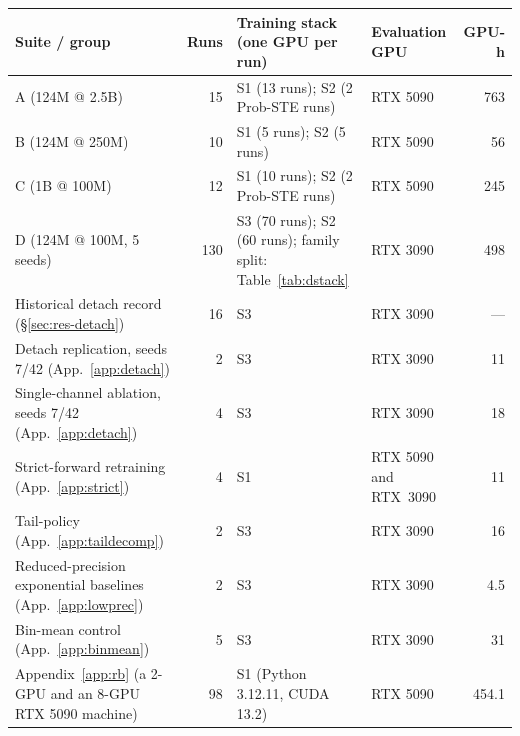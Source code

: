 \begin{tabular}{>{\raggedright\arraybackslash}p{5.2cm}rp{5.0cm}>{\raggedright\arraybackslash}p{2.4cm}r}
\toprule
Suite / group & Runs & Training stack (one GPU per run) & Evaluation GPU & GPU-h \\
\midrule
A (124M @ 2.5B) & 15 & S1 (13 runs); S2 (2 Prob-STE runs) & RTX 5090 & 763 \\
B (124M @ 250M) & 10 & S1 (5 runs); S2 (5 runs) & RTX 5090 & 56 \\
C (1B @ 100M) & 12 & S1 (10 runs); S2 (2 Prob-STE runs) & RTX 5090 & 245 \\
D (124M @ 100M, 5 seeds) & 130 & S3 (70 runs); S2 (60 runs); family split: Table~\ref{tab:dstack} & RTX 3090 & 498 \\
\midrule Historical detach record (\S\ref{sec:res-detach}) & 16 & S3 & RTX 3090 & --- \\
Detach replication, seeds 7/42 (App.~\ref{app:detach}) & 2 & S3 & RTX 3090 & 11 \\
Single-channel ablation, seeds 7/42 (App.~\ref{app:detach}) & 4 & S3 & RTX 3090 & 18 \\
Strict-forward retraining (App.~\ref{app:strict}) & 4 & S1 & RTX 5090 and RTX~3090 & 11 \\
Tail-policy (App.~\ref{app:taildecomp}) & 2 & S3 & RTX 3090 & 16 \\
Reduced-precision exponential baselines (App.~\ref{app:lowprec}) & 2 & S3 & RTX 3090 & 4.5 \\
Bin-mean control (App.~\ref{app:binmean}) & 5 & S3 & RTX 3090 & 31 \\
\midrule Appendix~\ref{app:rb} (a 2-GPU and an 8-GPU RTX 5090 machine) & 98 & S1 (Python 3.12.11, CUDA 13.2) & RTX 5090 & 454.1 \\
\bottomrule
\end{tabular}
